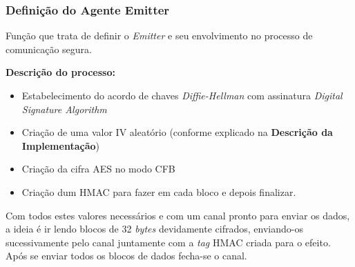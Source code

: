\documentclass[12pt]{report}
\providecommand{\tightlist}{%
      \setlength{\itemsep}{0pt}\setlength{\parskip}{0pt}}
\begin{document}
    \hypertarget{definiuxe7uxe3o-do-agente-emitter}{%
\subsubsection{Definição do Agente
Emitter}\label{definiuxe7uxe3o-do-agente-emitter}}

Função que trata de definir o \emph{Emitter} e seu envolvimento no
processo de comunicação segura.

\textbf{Descrição do processo:}

\begin{itemize}
\tightlist
\item
  Estabelecimento do acordo de chaves \emph{Diffie-Hellman} com
  assinatura \emph{Digital Signature Algorithm}
\item
  Criação de uma valor IV aleatório (conforme explicado na
  \textbf{Descrição da Implementação})
\item
  Criação da cifra AES no modo CFB
\item
  Criação dum HMAC para fazer em cada bloco e depois finalizar.
\end{itemize}

Com todos estes valores necessários e com um canal pronto para enviar os
dados, a ideia é ir lendo blocos de 32 \emph{bytes} devidamente
cifrados, enviando-os sucessivamente pelo canal juntamente com a
\emph{tag} HMAC criada para o efeito. Após se enviar todos os blocos de
dados fecha-se o canal.
\end{document}
